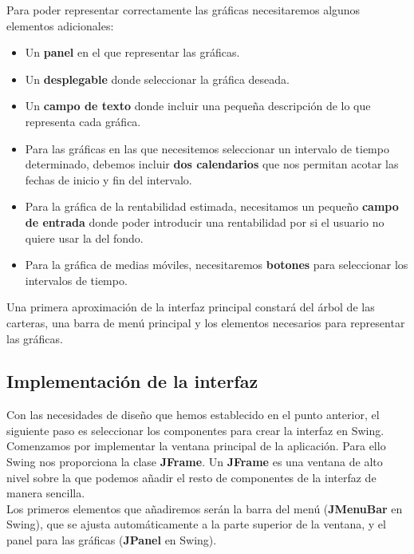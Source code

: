 \documentclass[12pt, a4paper]{book}
\begin{document}
Para poder representar correctamente las gráficas necesitaremos algunos elementos adicionales: 
\begin{itemize}
	\item Un \textbf{panel} en el que representar las gráficas.
	\item Un \textbf{desplegable} donde seleccionar la gráfica deseada.
	\item Un \textbf{campo de texto} donde incluir una pequeña descripción de lo que representa cada gráfica.
	\item Para las gráficas en las que necesitemos seleccionar un intervalo de tiempo determinado, debemos incluir \textbf{dos calendarios} que nos permitan acotar las fechas de inicio y fin del intervalo.
	\item Para la gráfica de la rentabilidad estimada, necesitamos un pequeño \textbf{campo de entrada} donde poder introducir una rentabilidad por si el usuario no quiere usar la del fondo.
	\item Para la gráfica de medias móviles, necesitaremos \textbf{botones} para seleccionar los intervalos de tiempo.
\end{itemize}


Una primera aproximación de la interfaz principal constará del árbol de las carteras, una barra de menú principal y los elementos necesarios para representar las gráficas.

\newpage

\subsection{Implementación de la interfaz}

Con las necesidades de diseño que hemos establecido en el punto anterior, el siguiente paso es seleccionar los componentes para crear la interfaz en Swing.
\\

Comenzamos por implementar la ventana principal de la aplicación. Para ello Swing nos proporciona la clase \textbf{JFrame}. Un \textbf{JFrame} es una ventana de alto nivel sobre la que podemos añadir el resto de componentes de la interfaz de manera sencilla.
\\

Los primeros elementos que añadiremos serán la barra del menú (\textbf{JMenuBar} en Swing), que se ajusta automáticamente a la parte superior de la ventana, y el panel para las gráficas (\textbf{JPanel} en Swing).
\\
\end{document}

